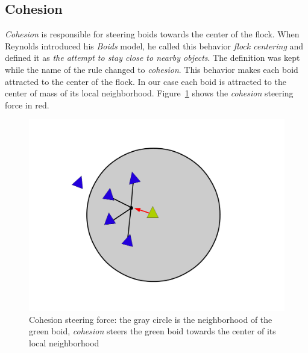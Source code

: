 \subsection{Cohesion}
\textit{Cohesion} is responsible for steering boids towards the center of the flock. When Reynolds introduced his \textit{Boids} model, he called this behavior \textit{flock centering} and defined it as \textit{the attempt to stay close to nearby objects}. The definition was kept while the name of the rule changed to \textit{cohesion}. This behavior makes each boid attracted to the center of the flock. In our case each boid is attracted to the center of mass of its local neighborhood.   Figure~\ref{cohesionPDF} shows the \textit{cohesion} steering force in red.

\begin{figure}[htbp]
\begin{center}
\includegraphics[scale=0.3]{figures/cohesion.pdf}
\caption{Cohesion steering force: the gray circle is the neighborhood of the green boid, \textit{cohesion} steers the green boid towards the center of its local neighborhood}
\label{cohesionPDF}
\end{center}
\end{figure}

